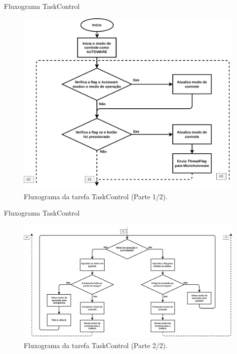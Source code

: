 \documentclass{if-beamer}
\begin{document}
\begin{frame}{Fluxograma TaskControl}

\begin{figure}[H]
	\centering
	\includegraphics[width=0.6\linewidth]{img/fluxograma_taskcontrol_1}
	\caption{Fluxograma da tarefa TaskControl (Parte 1/2).}
	\label{fig:fluxograma_taskcontrol_1}
\end{figure}

\end{frame}


\begin{frame}{Fluxograma TaskControl}



	\begin{figure}[H]
		\centering
		\includegraphics[width=0.9\linewidth]{img/fluxograma_taskcontrol_2}
		\caption{Fluxograma da tarefa TaskControl (Parte 2/2).}
		\label{fig:fluxograma_taskcontrol_2}
\end{figure}

\end{frame}
\end{document}
